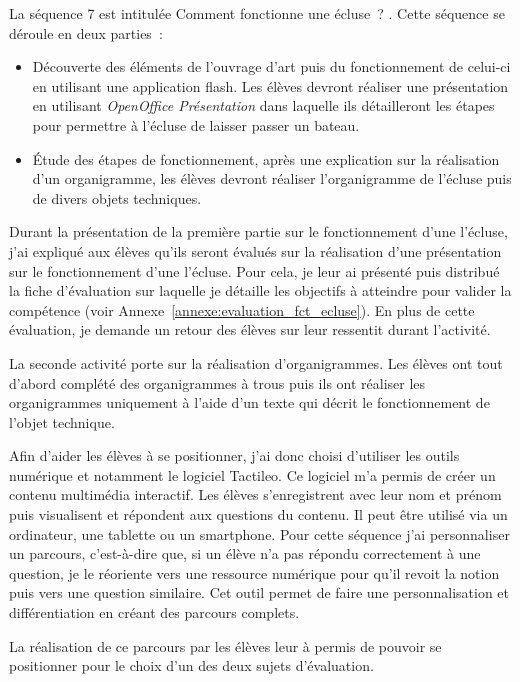 La séquence 7 est intitulée \og Comment fonctionne une écluse~? \fg{}.
Cette séquence se déroule en deux parties~:
\begin{itemize}
\item Découverte des éléments de l'ouvrage d'art puis du fonctionnement de celui-ci en utilisant une application flash. Les élèves devront réaliser une présentation en utilisant \textit{OpenOffice Présentation} dans laquelle ils détailleront les étapes pour permettre à l'écluse de laisser passer un bateau.
\item Étude des étapes de fonctionnement, après une explication sur la réalisation d'un organigramme, les élèves devront réaliser l'organigramme de l'écluse puis de divers objets techniques.
\end{itemize} 

Durant la présentation de la première partie sur le fonctionnement d'une l'écluse, j'ai expliqué aux élèves qu'ils seront évalués sur la réalisation d'une présentation sur le fonctionnement d'une l'écluse.
Pour cela, je leur ai présenté puis distribué la fiche d'évaluation sur laquelle je détaille les objectifs à atteindre pour valider la compétence (voir Annexe~\ref{annexe:evaluation_fct_ecluse}).
En plus de cette évaluation, je demande un retour des élèves sur leur ressentit durant l'activité.

La seconde activité porte sur la réalisation d'organigrammes.
Les élèves ont tout d'abord complété des organigrammes à trous puis ils ont réaliser les organigrammes uniquement à l'aide d'un texte qui décrit le fonctionnement de l'objet technique.

Afin d'aider les élèves à se positionner, j'ai donc choisi d'utiliser les outils numérique et notamment le logiciel Tactileo. 
Ce logiciel m'a permis de créer un contenu multimédia interactif.
Les élèves s'enregistrent avec leur nom et prénom puis visualisent et répondent aux questions du contenu.
Il peut être utilisé via un ordinateur, une tablette ou un smartphone.
Pour cette séquence j'ai personnaliser un parcours, c'est-à-dire que, si un élève n'a pas répondu correctement à une question, je le réoriente vers une ressource numérique pour qu'il revoit la notion puis vers une question similaire. Cet outil permet de faire une personnalisation et différentiation en créant des parcours complets.

La réalisation de ce parcours par les élèves leur à permis de pouvoir se positionner pour le choix d'un des deux sujets d'évaluation.

\newpage
